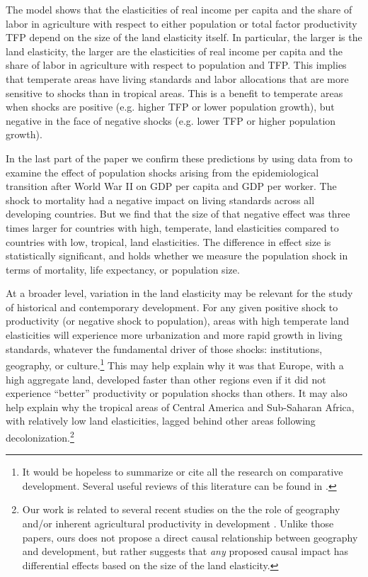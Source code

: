 \documentclass[11pt]{article}
\begin{document}
The model shows that the elasticities of real income per capita and the share of labor in agriculture with respect to either population or total factor productivity TFP depend on the size of the land elasticity itself. In particular, the larger is the land elasticity, the larger are the elasticities of real income per capita and the share of labor in agriculture with respect to population and TFP. This implies that temperate areas have living standards and labor allocations that are more sensitive to shocks than in tropical areas. This is a benefit to temperate areas when shocks are positive (e.g. higher TFP or lower population growth), but negative in the face of negative shocks (e.g. lower TFP or higher population growth).

In the last part of the paper we confirm these predictions by using data from \cite{aj07} to examine the effect of population shocks arising from the epidemiological transition after World War II on GDP per capita and GDP per worker. The shock to mortality had a negative impact on living standards across all developing countries. But we find that the size of that negative effect was three times larger for countries with high, temperate, land elasticities compared to countries with low, tropical, land elasticities. The difference in effect size is statistically significant, and holds whether we measure the population shock in terms of mortality, life expectancy, or population size.

At a broader level, variation in the land elasticity may be relevant for the study of historical and contemporary development. For any given positive shock to productivity (or negative shock to population), areas with high temperate land elasticities will experience more urbanization and more rapid growth in living standards, whatever the fundamental driver of those shocks: institutions, geography, or culture.\footnote{It would be hopeless to summarize or cite all the research on comparative development. Several useful reviews of this literature can be found in \cite{ajr2005handbook,nunn_2009,Galor:2011uq,sw2013,vries2013}.} This may help explain why it was that Europe, with a high aggregate land, developed faster than other regions even if it did not experience ``better'' productivity or population shocks than others. It may also help explain why the tropical areas of Central America and Sub-Saharan Africa, with relatively low land elasticities, lagged behind other areas following decolonization.\footnote{Our work is related to several recent studies on the the role of geography and/or inherent agricultural productivity in development \citep{oh2005,ashraf2010dynamics,Nunn2011,Nunn2012,mich2012,agn2013,cook14,cook2014role,fenske2014,alsan2015,ashrafmich2015,dks2015,galorozak2016,litina2016,ads2016,FrankemaPap2017}. Unlike those papers, ours does not propose a direct causal relationship between geography and development, but rather suggests that \textit{any} proposed causal impact has differential effects based on the size of the land elasticity.} 
\end{document}
